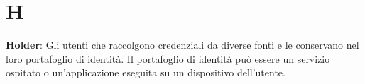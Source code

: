 \section{H}
\textbf{Holder}: Gli utenti che raccolgono credenziali da diverse fonti e le conservano nel loro portafoglio di identità. Il portafoglio di identità può essere un servizio ospitato o un'applicazione eseguita su un dispositivo dell'utente.\\

